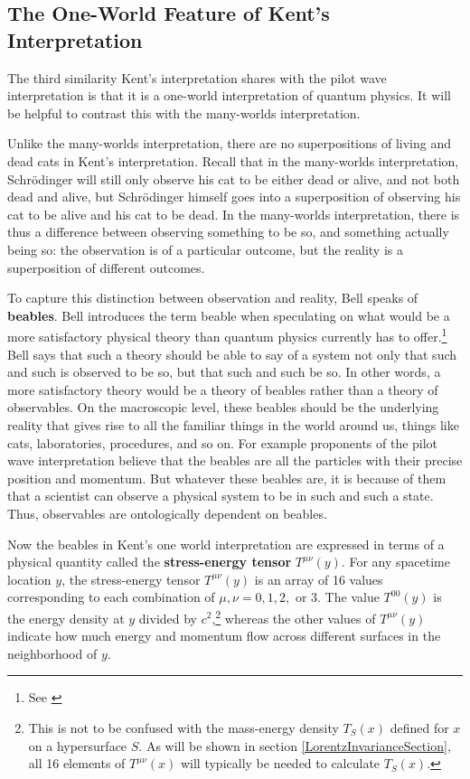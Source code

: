 \subsection{The One-World Feature of Kent's Interpretation}
The third similarity Kent's interpretation shares with the pilot wave interpretation is that it is a one-world interpretation of quantum physics. It will be helpful to contrast this with the many-worlds interpretation. 

Unlike the many-worlds interpretation, there are no superpositions of living and dead cats in Kent's interpretation. Recall that in the many-worlds interpretation, Schr\"{o}dinger will still only observe his cat to be either dead or alive, and not both dead and alive, but Schr\"{o}dinger himself goes into a superposition of observing his cat to be alive and his cat to be dead. In the many-worlds interpretation, there is thus a difference between observing something to be so, and something actually being so: the observation is of a particular outcome, but the reality is a superposition of different outcomes. 

To capture this distinction between observation and reality, Bell speaks of \textbf{beables}.\label{beabledef} Bell introduces the term beable when speculating on what would be a more satisfactory physical theory than quantum physics currently has to offer.\footnote{See \cite{Bell2}} Bell says that such a theory should be able to say of a system not only that such and such is observed to be so, but that such and such be so. In other words, a more satisfactory theory would be a theory of beables rather than a theory of observables. On the macroscopic level, these beables should be the underlying reality that gives rise to all the familiar things in the world around us, things like cats, laboratories, procedures, and so on. For example proponents of the pilot wave interpretation believe that the beables are all the particles with their precise position and momentum. But whatever these beables are, it is because of them that a scientist can observe a physical system to be in such and such a state. Thus, observables are ontologically dependent on beables.   

Now the beables in Kent's one world interpretation are expressed in terms of a physical quantity called the \textbf{stress-energy tensor}  $T^{\mu\nu}(y)$.\label{stressenergy}  For any spacetime location $y$, the stress-energy tensor $T^{\mu\nu}(y)$ is an array of 16 values corresponding to each combination of $\mu, \nu=0,1,2,$ or $3$. The value $T^{00}(y)$ is the energy density at $y$ divided by $c^2$,\footnote{This is not to be confused with the mass-energy density $T_S(x)$ defined for $x$ on a hypersurface $S$. As will be shown in section \ref{LorentzInvarianceSection},   all 16 elements of $T^{\mu\nu}(x)$ will typically be needed to calculate $T_S(x)$.} whereas the other values of $T^{\mu\nu}(y)$ indicate how much energy and momentum flow across different surfaces in the neighborhood of $y$. 

